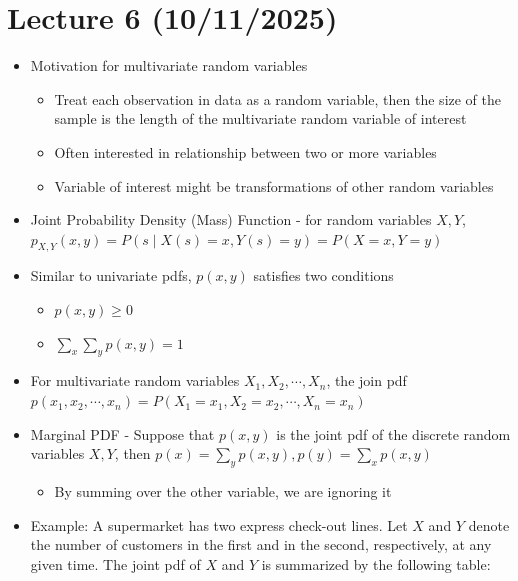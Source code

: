 \documentclass{article}
\begin{document}
\section{Lecture 6 (10/11/2025)}
\begin{itemize}
\subsection{Slide 6}
    \item Motivation for multivariate random variables
    \begin{itemize}
        \item Treat each observation in data as a random variable, then the size of the sample is the length of the multivariate random variable of interest
        \item Often interested in relationship between two or more variables
        \item Variable of interest might be transformations of other random variables
    \end{itemize}
    \item Joint Probability Density (Mass) Function - for random variables $X,Y$, $p_{X,Y}(x,y)=P(s \mid X(s) = x, Y(s) = y) = P(X=x, Y=y)$
    \item Similar to univariate pdfs, $p(x,y)$ satisfies two conditions
    \begin{itemize}
        \item $p(x,y) \ge 0$
        \item $\sum_x \sum_y p(x,y) = 1$
    \end{itemize}
    \item For multivariate random variables $X_1, X_2, \cdots , X_n$, the join pdf $p(x_1,x_2, \cdots, x_n) = P(X_1=x_1, X_2=x_2, \cdots, X_n=x_n)$
    \item Marginal PDF - Suppose that $p(x,y)$ is the joint pdf of the discrete random variables $X,Y$, then $p(x) = \sum_y p(x,y), p(y) = \sum_x p(x,y)$
    \begin{itemize}
        \item By summing over the other variable, we are ignoring it
    \end{itemize}
    \item Example: A supermarket has two express check-out lines. Let $X$ and $Y$ denote the number of customers in the first and in the second, respectively, at any given time. The joint pdf of $X$ and $Y$ is summarized by the following table:
    \[ \begin{array}{cc|cccc}

\end{array}\]
\end{itemize}
\end{document}
